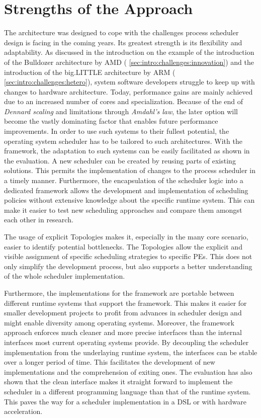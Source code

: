 \section{Strengths of the Approach}%
\label{sec:concl:strengths}

The \cobas{} architecture was designed to cope with the challenges process scheduler design is facing in the coming years. Its greatest strength is its flexibility and adaptability. As discussed in the introduction on the example of the introduction of the Bulldozer architecture by AMD (\cf{} \cref{sec:intro:challenges:innovation}) and the introduction of the big.LITTLE architecture by ARM (\cf{} \cref{sec:intro:challenges:hetero}), system software developers struggle to keep up with changes to hardware architecture. Today, performance gains are mainly achieved due to an increased number of cores and specialization. Because of the end of \emph{Dennard scaling} and limitations through \emph{Amdahl's law}, the later option will become the vastly dominating factor that enables future performance improvements. In order to use such systems to their fullest potential, the operating system scheduler has to be tailored to such architectures. With the \cobas{} framework, the adaptation to such systems can be easily facilitated as shown in the evaluation. A new scheduler can be created by reusing parts of existing solutions. This permits the implementation of changes to the process scheduler in a timely manner. Furthermore, the encapsulation of the scheduler logic into a dedicated framework allows the development and implementation of scheduling policies without extensive knowledge about the specific runtime system. This can make it easier to test new scheduling approaches and compare them amongst each other in research.

The usage of explicit Topologies makes it, especially in the many core scenario, easier to identify potential bottlenecks. The Topologies allow the explicit and visible assignment of specific scheduling strategies to specific \acp{PE}. This does not only simplify the development process, but also supports a better understanding of the whole scheduler implementation.

Furthermore, the implementations for the \cobas{} framework are portable between different runtime systems that support the \cobas{} framework. This makes it easier for smaller development projects to profit from advances in scheduler design and might enable diversity among operating systems. Moreover, the framework approach enforces much cleaner and more precise interfaces than the internal interfaces most current operating systems provide. By decoupling the scheduler implementation from the underlaying runtime system, the interfaces can be stable over a longer period of time. This facilitates the development of new implementations and the comprehension of exiting ones. The evaluation has also shown that the clean interface makes it straight forward to implement the scheduler in a different programming language than that of the runtime system. This paves the way for a scheduler implementation in a \ac{DSL} or with hardware acceleration.

